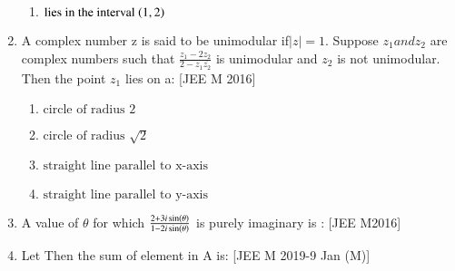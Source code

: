 \documentclass[journal,12pt,twocolumn,article]{IEEEtran}
\theoremstyle{remark}
\begin{document}
\begin{enumerate}[start = 14]
\begin{enumerate}
\item $\text {lies in the interval $\left(1,2\right)$}$

\end{enumerate}

\item A complex number z is said to be unimodular if$|z|=1$. Suppose $z_1 and z_2$ are complex numbers such that $\frac{z_1 -2z_2}{2-z_1\overline{z_2}}$ is unimodular and $z_2$ is not unimodular. Then the point $z_1$ lies on a:                                
\hfill{[JEE M 2016]}                               

\begin{enumerate}                                  
                              
\item $\text {circle of radius 2}$
                             
\item $\text {circle of radius $\sqrt2$}$

\item $\text {straight line parallel to x-axis}$

\item $\text {straight line parallel to y-axis}$

\end{enumerate}

\item A value of $\theta$ for which $\frac{2+3i\sin\left(\theta\right)}{1-2i\sin\left(\theta\right)}$ is purely imaginary is :      
\hfill{[JEE M2016]}

\begin{enumerate}
\end{enumerate}                                     

\item Let   Then the sum of element in A is:
\hfill{[JEE M 2019-9 Jan (M)]}
\begin{enumerate}
\end{enumerate}


\end{enumerate}
\end{document}
